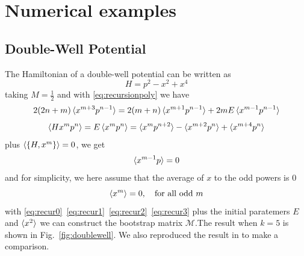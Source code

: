 \documentclass[aps, preprint,amsmath, amssymb]{revtex4-2}
\begin{document}
\section{Numerical examples}
\subsection {Double-Well Potential}
The Hamiltonian of a double-well potential can be written as
\begin{equation}
	H = p^2 - x^2 + x^4
\end{equation}
taking $M = \frac12$ and with \eqref{eq:recursionpoly} we have
\begin{equation}
	2(2n + m)\braket{x^{m + 3} p^{n - 1}} = 2(m + n)\braket{x^{m + 1} p^{n - 1}} + 2mE\braket{x^{m - 1} p^{n - 1}} \label{eq:recur0}
\end{equation}
\begin{equation}
	\braket{Hx^m p^n} = E\braket{x^m p^n} = \braket{x^m p^{n + 2}} - \braket{x^{m + 2} p^n} + \braket{x^{m + 4} p^n} \label{eq:recur1}
\end{equation}
plus $\braket{\{H, x^m\}} = 0$, we get
\begin{equation}
	\braket{x^{m - 1} p} = 0 \label{eq:recur2}
\end{equation}
and for simplicity, we here assume that the average of $x$ to the odd powers is $0$
\begin{equation}
	\braket{x^m} = 0,\ \ \ \text{for all odd}\ m \label{eq:recur3}
\end{equation}
with \eqref{eq:recur0}~\eqref{eq:recur1}~\eqref{eq:recur2}~\eqref{eq:recur3} plus the initial paratemers $E$ and $\braket{x^2}$ we can construct the bootstrap matrix $\bm{\mathcal{M}}$.The result when $k = 5$ is shown in Fig.~\ref{fig:doublewell}. We also reproduced the result in \cite{Nakayama_2022} to make a comparison.
\end{document}
